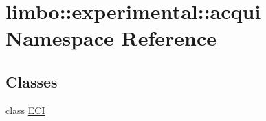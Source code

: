 \hypertarget{namespacelimbo_1_1experimental_1_1acqui}{}\section{limbo\+:\+:experimental\+:\+:acqui Namespace Reference}
\label{namespacelimbo_1_1experimental_1_1acqui}
\subsection*{Classes}
\begin{DoxyCompactItemize}
\item 
class \hyperlink{classlimbo_1_1experimental_1_1acqui_1_1_e_c_i}{E\+C\+I}
\end{DoxyCompactItemize}
